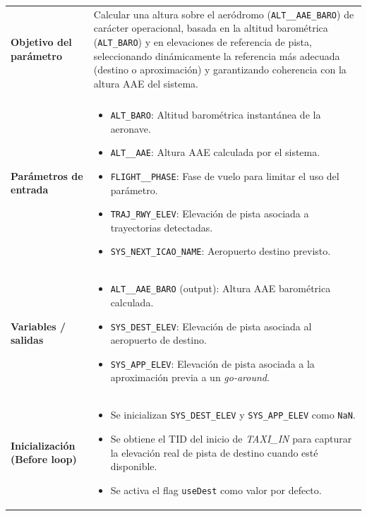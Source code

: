 \documentclass[11pt,a4paper]{article}
\begin{document}
	\begin{longtable}{p{5cm} p{9.5cm}}
		\renewcommand{\arraystretch}{1.3}
		\textbf{Objetivo del parámetro} &
		Calcular una altura sobre el aeródromo (\texttt{ALT\_\_AAE\_BARO}) de carácter operacional, basada en la altitud barométrica (\texttt{ALT\_BARO}) y en elevaciones de referencia de pista, seleccionando dinámicamente la referencia más adecuada (destino o aproximación) y garantizando coherencia con la altura AAE del sistema. \\
		\\ \hline
		
		\textbf{Parámetros de entrada} &
		\begin{itemize}
			\item \texttt{ALT\_BARO}: Altitud barométrica instantánea de la aeronave.
			\item \texttt{ALT\_\_AAE}: Altura AAE calculada por el sistema.
			\item \texttt{FLIGHT\_\_PHASE}: Fase de vuelo para limitar el uso del parámetro.
			\item \texttt{TRAJ\_RWY\_ELEV}: Elevación de pista asociada a trayectorias detectadas.
			\item \texttt{SYS\_NEXT\_ICAO\_NAME}: Aeropuerto destino previsto.
		\end{itemize}
		\\
		
		\textbf{Variables / salidas} &
		\begin{itemize}
			\item \texttt{ALT\_\_AAE\_BARO} (output): Altura AAE barométrica calculada.
			\item \texttt{SYS\_DEST\_ELEV}: Elevación de pista asociada al aeropuerto de destino.
			\item \texttt{SYS\_APP\_ELEV}: Elevación de pista asociada a la aproximación previa a un \textit{go-around}.
		\end{itemize}
		\\ \hline
		
		\textbf{Inicialización (Before loop)} &
		\begin{itemize}
			\item Se inicializan \texttt{SYS\_DEST\_ELEV} y \texttt{SYS\_APP\_ELEV} como \texttt{NaN}.
			\item Se obtiene el TID del inicio de \textit{TAXI\_IN} para capturar la elevación real de pista de destino cuando esté disponible.
			\item Se activa el flag \texttt{useDest} como valor por defecto.
		\end{itemize}
		\\ \hline
		

\end{longtable}
\end{document}
